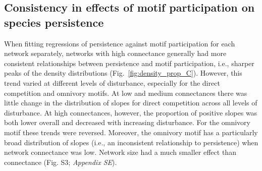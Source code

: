 \documentclass[12pt]{article}
\begin{document}
\begin{spacing}{2.0}
    \subsection*{Consistency in effects of motif participation on species persistence}

        
        When fitting regressions of persistence against motif participation for each network separately, networks with high connectance generally had more consistent relationships between persistence and motif participation, i.e., sharper peaks of the density distributions (Fig.~\ref{fig:density_prop_C}).
        However, this trend varied at different levels of disturbance, especially for the direct competition and omnivory motifs.
        At low and medium connectances there was little change in the distribution of slopes for direct competition across all levels of disturbance. 
        At high connectances, however, the proportion of positive slopes was both lower overall and decreased with increasing disturbance. 
        For the omnivory motif these trends were reversed. 
        Moreover, the omnivory motif has a particularly broad distribution of slopes (i.e., an inconsistent relationship to persistence) when network connectance was low. 
        Network size had a much smaller effect than connectance (Fig. S3; \emph{Appendix SE}).


\end{spacing}
\end{document}
